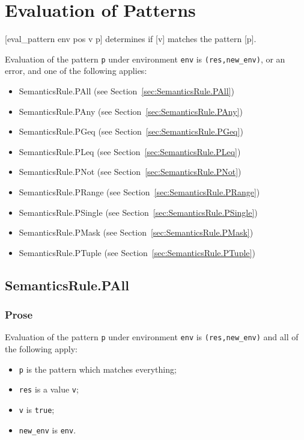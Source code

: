 \documentclass{book}
\begin{document}
\chapter{Evaluation of Patterns \label{chap:eval_pattern}}
[eval\_pattern env pos v p] determines if [v] matches the pattern [p].

Evaluation of the pattern \texttt{p} under environment \texttt{env} is
\texttt{(res,new\_env)}, or an error, and one of the following applies:
\begin{itemize}
\item SemanticsRule.PAll (see Section~\ref{sec:SemanticsRule.PAll})
\item SemanticsRule.PAny (see Section~\ref{sec:SemanticsRule.PAny})
\item SemanticsRule.PGeq (see Section~\ref{sec:SemanticsRule.PGeq})
\item SemanticsRule.PLeq (see Section~\ref{sec:SemanticsRule.PLeq})
\item SemanticsRule.PNot (see Section~\ref{sec:SemanticsRule.PNot})
\item SemanticsRule.PRange (see Section~\ref{sec:SemanticsRule.PRange})
\item SemanticsRule.PSingle (see Section~\ref{sec:SemanticsRule.PSingle})
\item SemanticsRule.PMask (see Section~\ref{sec:SemanticsRule.PMask})
\item SemanticsRule.PTuple (see Section~\ref{sec:SemanticsRule.PTuple})
\end{itemize}

\section{SemanticsRule.PAll \label{sec:SemanticsRule.PAll}}

  \subsection{Prose}
  Evaluation of the pattern \texttt{p} under environment \texttt{env} is
  \texttt{(res,new\_env)} and all of the following apply:
  \begin{itemize}  
  \item \texttt{p} is the pattern which matches everything;
  \item \texttt{res} is a value \texttt{v};
  \item \texttt{v} is \texttt{true};
  \item \texttt{new\_env} is \texttt{env}.
  \end{itemize}
\end{document}
